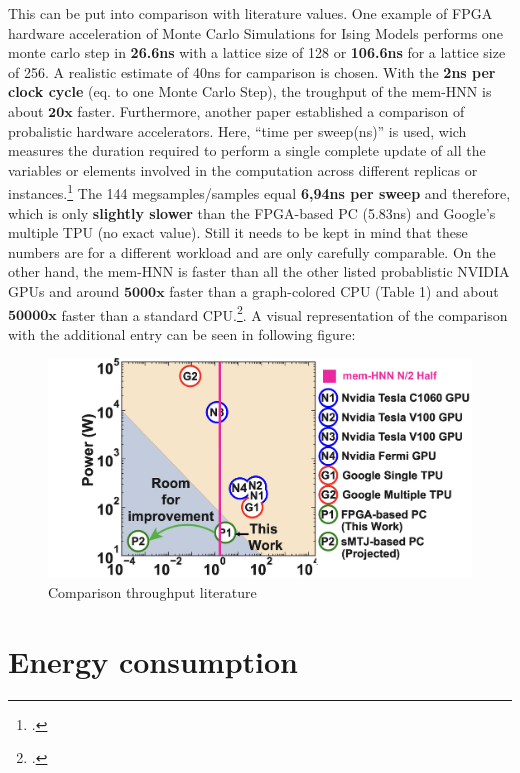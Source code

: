 This can be put into comparison with literature values. One example of \ac{FPGA} hardware acceleration of Monte Carlo Simulations for Ising Models
performs one monte carlo step in \textbf{26.6ns} with a lattice size of 128 or \textbf{106.6ns} for a lattice size of 256.
A realistic estimate of 40ns for camparison is chosen. With the \textbf{2ns per clock cycle} (eq. to one Monte Carlo Step),
the troughput of the \ac{mem-HNN} is about \(\mathbf{20x}\) faster.
Furthermore, another paper established a comparison of probalistic hardware accelerators. Here, ``time per sweep(ns)'' is used, wich measures the duration required to perform a single complete update of all the variables or elements involved in the computation across different replicas or instances.\footcite[cf.][2]{aaditAcceleratingAdaptiveParallel2023}
The 144 megsamples/samples equal \textbf{6,94ns per sweep} and therefore, which is only \textbf{slightly slower} than the FPGA-based PC (5.83ns) and Google’s
multiple TPU (no exact value). Still it needs to be kept in mind that these numbers are for a different workload and are only carefully comparable. 
On the other hand, the \ac{mem-HNN} is faster than all the other listed probablistic NVIDIA \ac{GPU}s and around \(\mathbf{5000x}\) faster than a graph-colored \ac{CPU} (Table 1) and about \(\mathbf{50000x}\) faster than a standard \ac{CPU}.\footcite[cf.][2]{aaditAcceleratingAdaptiveParallel2023}.
A visual representation of the comparison with the additional entry can be seen in following figure:
\begin{figure}[H]
    \centering
    \includegraphics[width=0.9\linewidth]{graphics/Comparison_throughput_energy.jpg}
    \caption{Comparison throughput literature}
    \label{Comparison_throughput_literature}
\end{figure}

\section{Energy consumption}

